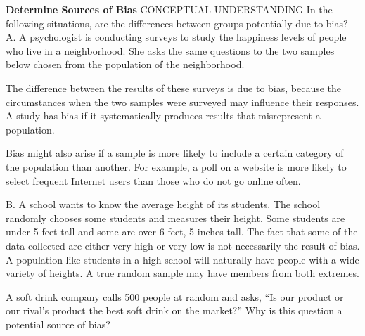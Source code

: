 \documentclass{article}
\newenvironment{example}[1]{}{}         %
\newenvironment{tryit}[1]{}{}           %
\newcommand{\answer}[1]{}               %
\newcommand{\placeholder}[2]{}          %
\newcommand{\te}[1]{}                   %
\begin{document}
\begin{example}{2}
\textbf{Determine Sources of Bias}
CONCEPTUAL UNDERSTANDING
In the following situations, are the differences between groups potentially due to bias?
A. A psychologist is conducting surveys to study the happiness levels of people who live in a neighborhood. She asks the same questions to the two samples below chosen from the population of the neighborhood.
\placeholder{photo}{Family playing outdoors on lined paper with red handwritten caption: 100 people surveyed, Sunny Saturday afternoon, 65\% people happy.}
\placeholder{photo}{Crowded transit car on lined paper with red handwritten caption: 100 people surveyed, Monday morning, 35\% people happy.}
The difference between the results of these surveys is due to bias, because the circumstances when the two samples were surveyed may influence their responses. A study has bias if it systematically produces results that misrepresent a population.
\answer{A. The difference between the results of these surveys is due to bias.}
\te{STUDY TIP Personal bias, or a personal inclination for or against something, and statistical bias are different. While personal bias can lead to statistical bias, statistical bias has many other possible causes.}
Bias might also arise if a sample is more likely to include a certain category of the population than another. For example, a poll on a website is more likely to select frequent Internet users than those who do not go online often.
\te{Callout: Bias can be introduced in other ways. For example, a survey might have questions that influence the answers in some way.}
B. A school wants to know the average height of its students. The school randomly chooses some students and measures their height. Some students are under 5 feet tall and some are over 6 feet, 5 inches tall.
The fact that some of the data collected are either very high or very low is not necessarily the result of bias. A population like students in a high school will naturally have people with a wide variety of heights. A true random sample may have members from both extremes.
\answer{B. The fact that some of the data collected are either very high or very low is not necessarily the result of bias.}
\te{MAKE SENSE AND PERSEVERE Why should you determine whether any differences in the collected data are due to a biased study or from natural variability in a population?}
\end{example}
\begin{tryit}{2}
A soft drink company calls 500 people at random and asks, ``Is our product or our rival's product the best soft drink on the market?'' Why is this question a potential source of bias?
\answer{This is bias, because the way the question is asked may lead respondents to give the answer the company wants.}
\end{tryit}
\end{document}
